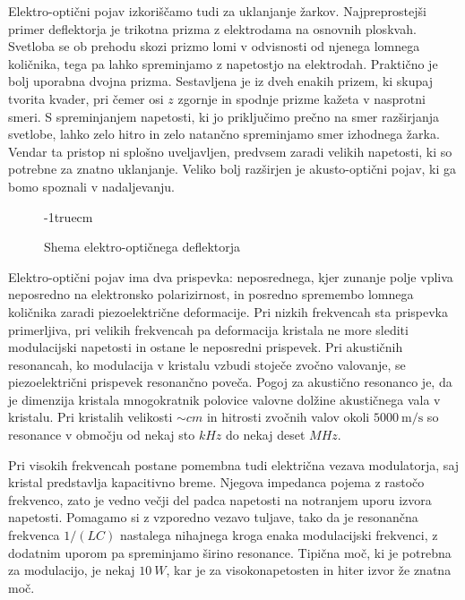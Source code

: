 \begin{remark}
Elektro-optični pojav izkoriščamo tudi za uklanjanje žarkov. 
Najpreprostejši primer deflektorja je trikotna prizma z elektrodama na osnovnih 
ploskvah. Svetloba se ob prehodu skozi prizmo lomi v odvisnosti od njenega 
lomnega količnika, tega pa lahko spreminjamo 
z napetostjo na elektrodah. Praktično je bolj uporabna dvojna prizma. Sestavljena je iz dveh enakih 
prizem, ki skupaj tvorita kvader, pri čemer osi $z$ zgornje in spodnje prizme
kažeta v nasprotni smeri. S spreminjanjem napetosti, ki jo priključimo prečno na smer
razširjanja svetlobe, lahko zelo hitro in zelo natančno spreminjamo smer izhodnega žarka. 
Vendar ta pristop ni splošno uveljavljen, predvsem zaradi velikih napetosti, ki so 
potrebne za znatno uklanjanje. Veliko bolj razširjen je akusto-optični pojav, ki ga 
bomo spoznali v nadaljevanju. 
\begin{figure}[h]
\centering
\def\svgwidth{85truemm} 

\caption{Shema elektro-optičnega deflektorja}
\vglue-1truecm
\label{fig:deflshema}
\end{figure}
\end{remark}
\begin{remark}
Elektro-optični pojav ima dva prispevka: neposrednega, kjer zunanje polje 
vpliva neposredno na elektronsko polarizirnost, in posredno spremembo
lomnega količnika zaradi piezoelektrične deformacije. Pri nizkih frekvencah sta prispevka 
primerljiva, pri velikih frekvencah pa deformacija kristala ne more slediti
modulacijski napetosti in ostane le neposredni prispevek. Pri akustičnih resonancah, ko 
modulacija v kristalu vzbudi stoječe zvočno valovanje, se piezoelektrični 
prispevek resonančno poveča. Pogoj za akustično resonanco je, da je dimenzija 
kristala mnogokratnik polovice valovne dolžine akustičnega vala v kristalu. 
Pri kristalih velikosti $\sim \si{cm}$ in hitrosti zvočnih valov okoli
$5000~\si{\m/\s}$ so resonance v območju od nekaj sto $\si{kHz}$ do
nekaj deset $\si{MHz}$. 

Pri visokih frekvencah postane pomembna tudi električna vezava modulatorja,
saj kristal predstavlja kapacitivno breme. Njegova impedanca pojema z 
rastočo frekvenco, zato je vedno večji del padca napetosti na notranjem 
uporu izvora napetosti. Pomagamo si z vzporedno vezavo tuljave, 
tako da je resonančna frekvenca $1/(LC)$ nastalega nihajnega kroga 
enaka modulacijski frekvenci, z dodatnim uporom pa spreminjamo širino resonance.
Tipična moč, ki je potrebna za modulacijo, je nekaj $10~\si{W}$, 
kar je za visokonapetosten in hiter izvor že znatna moč. 
\end{remark}


